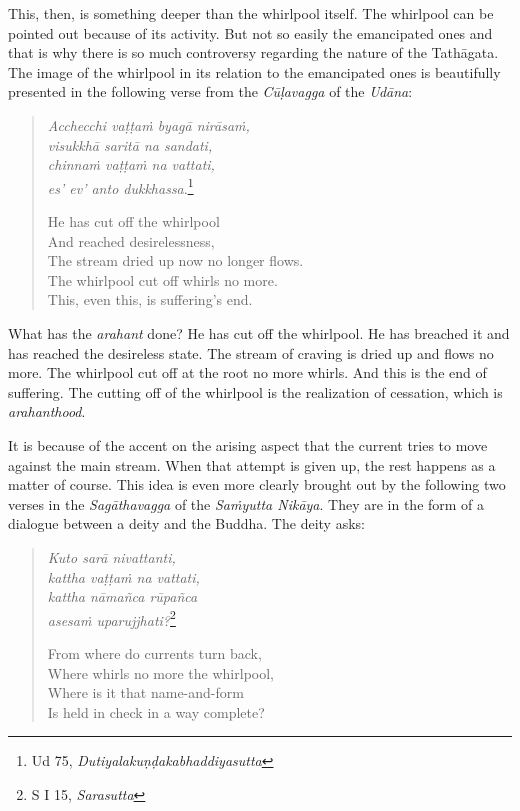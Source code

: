 This, then, is something deeper than the whirlpool itself. The whirlpool can be pointed out because of its activity. But not so easily the emancipated ones and that is why there is so much controversy regarding the nature of the Tathāgata. The image of the whirlpool in its relation to the emancipated ones is beautifully presented in the following verse from the \emph{Cūḷavagga} of the \emph{Udāna}:

\begin{quote}
\emph{Acchecchi vaṭṭaṁ byagā nirāsaṁ,}\\
\emph{visukkhā saritā na sandati,}\\
\emph{chinnaṁ vaṭṭaṁ na vattati,}\\
\emph{es' ev' anto dukkhassa}.\footnote{Ud 75, \emph{Dutiyalakuṇḍakabhaddiyasutta}}

He has cut off the whirlpool\\
And reached desirelessness,\\
The stream dried up now no longer flows.\\
The whirlpool cut off whirls no more.\\
This, even this, is suffering's end.
\end{quote}

What has the \emph{arahant} done? He has cut off the whirlpool. He has breached it and has reached the desireless state. The stream of craving is dried up and flows no more. The whirlpool cut off at the root no more whirls. And this is the end of suffering. The cutting off of the whirlpool is the realization of cessation, which is \emph{arahanthood}.

It is because of the accent on the arising aspect that the current tries to move against the main stream. When that attempt is given up, the rest happens as a matter of course. This idea is even more clearly brought out by the following two verses in the \emph{Sagāthavagga} of the \emph{Saṁyutta Nikāya}. They are in the form of a dialogue between a deity and the Buddha. The deity asks:

\begin{quote}
\emph{Kuto sarā nivattanti,}\\
\emph{kattha vaṭṭaṁ na vattati,}\\
\emph{kattha nāmañca rūpañca}\\
\emph{asesaṁ uparujjhati?}\footnote{S I 15, \emph{Sarasutta}}

From where do currents turn back,\\
Where whirls no more the whirlpool,\\
Where is it that name-and-form\\
Is held in check in a way complete?
\end{quote}

